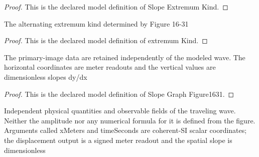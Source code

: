 \begin{proof}
  This is the declared model definition of Slope Extremum Kind.
\end{proof}
\begin{definition}
  \label{def:physics:phyx-mini-0287:phyxminiproblems-problemphyxmini0287-extremumkind}
  The alternating extremum kind determined by Figure 16-31
\end{definition}
\begin{proof}
  This is the declared model definition of extremum Kind.
\end{proof}
\begin{definition}
  \label{def:physics:phyx-mini-0287:phyxminiproblems-problemphyxmini0287-slopegraphfigure1631}
  The primary-image data are retained independently of the modeled wave. The horizontal coordinates are meter readouts and the vertical values are dimensionless slopes dy/dx
\end{definition}
\begin{proof}
  This is the declared model definition of Slope Graph Figure1631.
\end{proof}
\begin{definition}
  \label{def:physics:phyx-mini-0287:phyxminiproblems-problemphyxmini0287-sinusoidalstringwavesetup}
  Independent physical quantities and observable fields of the traveling wave. Neither the amplitude nor any numerical formula for it is defined from the figure. Arguments called xMeters and timeSeconds are coherent-SI scalar coordinates; the displacement output is a signed meter readout and the spatial slope is dimensionless
\end{definition}
